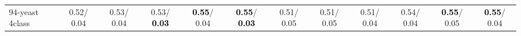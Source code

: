 \begin{table}[h]
\begin{center}
{\begin{tabular}{lc|c|c|c|c|c|c|c|c|c|c}
94-yeast 4class &   0.52/  0.04 &   0.53/  0.04 &   0.53/\textcolor{black}{\textbf{  0.03}} & \textcolor{black}{\textbf{  0.55}}/  0.04 & \textcolor{black}{\textbf{  0.55}}/\textcolor{black}{\textbf{  0.03}} &   0.51/  0.05 &   0.51/  0.05 &   0.51/  0.04 &   0.54/  0.04 & \textcolor{black}{\textbf{  0.55}}/  0.05 & \textcolor{black}{\textbf{  0.55}}/  0.04 \\\end{tabular}}\label{stratsBalAcc2b5NN}
\end{center}
\end{table}